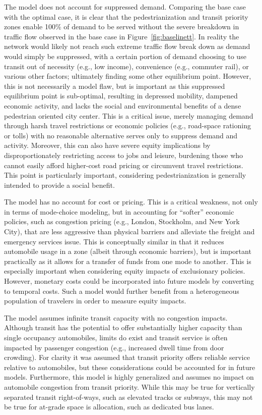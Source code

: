 \documentclass{elsarticle}\usepackage[]{graphicx}\usepackage[]{color}
\begin{document}
The model does not account for suppressed demand. Comparing the base case with the optimal case, it is clear that the pedestrianization and transit priority zones enable 100\% of demand to be served without the severe breakdown in traffic flow observed in the base case in Figure~\ref{fig:baselinett}. In reality the network would likely not reach such extreme traffic flow break down as demand would simply be suppressed, with a certain portion of demand choosing to use transit out of necessity (e.g., low income), convenience (e.g., commuter rail), or various other factors; ultimately finding some other equilibrium point. However, this is not necessarily a model flaw, but is important as this suppressed equilibrium point is sub-optimal, resulting in depressed mobility, dampened economic activity, and lacks the social and environmental benefits of a dense pedestrian oriented city center. This is a critical issue, merely managing demand through harsh travel restrictions or economic policies (e.g., road-space rationing or tolls) with no reasonable alternative serves only to suppress demand and activity. Moreover, this can also have severe equity implications by disproportionately restricting access to jobs and leisure, burdening those who cannot easily afford higher-cost road pricing or circumvent travel restrictions. This point is particularly important, considering pedestrianization is generally intended to provide a social benefit.

The model has no account for cost or pricing. This is a critical weakness, not only in terms of mode-choice modeling, but in accounting for ``softer'' economic policies, such as congestion pricing (e.g., London, Stockholm, and New York City), that are less aggressive than physical barriers and alleviate the freight and emergency services issue. This is conceptually similar in that it reduces automobile usage in a zone (albeit through economic barriers), but is important practically as it allows for a transfer of funds from one mode to another. This is especially important when considering equity impacts of exclusionary policies. However, monetary costs could be incorporated into future models by converting to temporal costs. Such a model would further benefit from a heterogeneous population of travelers in order to measure equity impacts.

The model assumes infinite transit capacity with no congestion impacts. Although transit has the potential to offer substantially higher capacity than single occupancy automobiles, limits do exist and transit service is often impacted by passenger congestion (e.g., increased dwell time from door crowding). For clarity it was assumed that transit priority offers reliable service relative to automobiles, but these considerations could be accounted for in future models. Furthermore, this model is highly generalized and assumes no impact on automobile congestion from transit priority. While this may be true for vertically separated transit right-of-ways, such as elevated tracks or subways, this may not be true for at-grade space is allocation, such as dedicated bus lanes.
\end{document}
